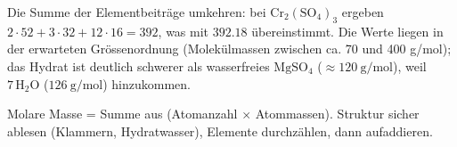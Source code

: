 \begin{kontrolle}
Die Summe der Elementbeiträge umkehren: bei $\mathrm{Cr_2(SO_4)_3}$ ergeben
$2\cdot 52 + 3\cdot 32 + 12\cdot 16 = 392$, was mit $392.18$ übereinstimmt. Die
Werte liegen in der erwarteten Grössenordnung (Molekülmassen zwischen ca. 70
und 400 g/mol); das Hydrat ist deutlich schwerer als wasserfreies
$\mathrm{MgSO_4}$ ($\approx 120\ \mathrm{g/mol}$), weil $7\,\mathrm{H_2O}$
($126\ \mathrm{g/mol}$) hinzukommen.
\end{kontrolle}

\begin{merksatz}
Molare Masse = Summe aus (Atomanzahl $\times$ Atommassen). Struktur sicher
ablesen (Klammern, Hydratwasser), Elemente durchzählen, dann aufaddieren.
\end{merksatz}
